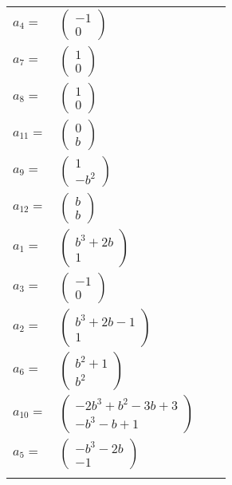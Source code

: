 \documentclass[1p]{elsarticle_modified}
\theoremstyle{definition}
\begin{document}
\begin{tabular}{m{7pt} m{180pt} m{7pt} m{180pt} }
\flushright $a_{4}=$&$\begin{pmatrix}-1\\0\end{pmatrix}$ \\
\flushright $a_{7}=$&$\begin{pmatrix}1\\0\end{pmatrix}$ \\
\flushright $a_{8}=$&$\begin{pmatrix}1\\0\end{pmatrix}$ \\
\flushright $a_{11}=$&$\begin{pmatrix}0\\b\end{pmatrix}$ \\
\flushright $a_{9}=$&$\begin{pmatrix}1\\- b^2\end{pmatrix}$ \\
\flushright $a_{12}=$&$\begin{pmatrix}b\\b\end{pmatrix}$ \\
\flushright $a_{1}=$&$\begin{pmatrix}b^3+2 b\\1\end{pmatrix}$ \\
\flushright $a_{3}=$&$\begin{pmatrix}-1\\0\end{pmatrix}$ \\
\flushright $a_{2}=$&$\begin{pmatrix}b^3+2 b-1\\1\end{pmatrix}$ \\
\flushright $a_{6}=$&$\begin{pmatrix}b^2+1\\b^2\end{pmatrix}$ \\
\flushright $a_{10}=$&$\begin{pmatrix}-2 b^3+b^2-3 b+3\\- b^3- b+1\end{pmatrix}$ \\
\flushright $a_{5}=$&$\begin{pmatrix}- b^3-2 b\\-1\end{pmatrix}$\\&\end{tabular}
\end{document}
